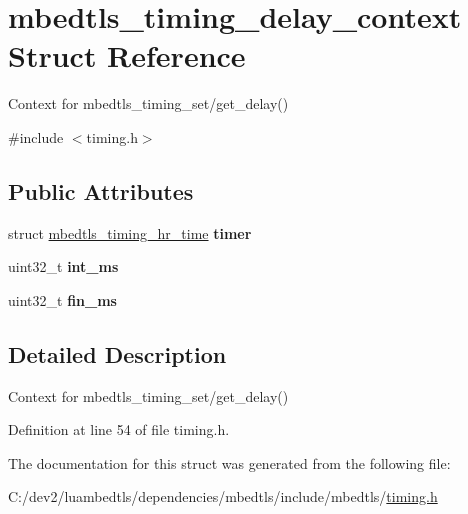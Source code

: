 \hypertarget{structmbedtls__timing__delay__context}{\section{mbedtls\-\_\-timing\-\_\-delay\-\_\-context Struct Reference}
\label{structmbedtls__timing__delay__context}
}


Context for mbedtls\-\_\-timing\-\_\-set/get\-\_\-delay()  




{\ttfamily \#include $<$timing.\-h$>$}

\subsection*{Public Attributes}
\begin{DoxyCompactItemize}
\item 
\hypertarget{structmbedtls__timing__delay__context_abf629e677a656c08a5aa3e5ba0cbf2d5}{struct \hyperlink{structmbedtls__timing__hr__time}{mbedtls\-\_\-timing\-\_\-hr\-\_\-time} {\bfseries timer}}\label{structmbedtls__timing__delay__context_abf629e677a656c08a5aa3e5ba0cbf2d5}

\item 
\hypertarget{structmbedtls__timing__delay__context_a9887c5bc1eb16059afbc163052ca1cb8}{uint32\-\_\-t {\bfseries int\-\_\-ms}}\label{structmbedtls__timing__delay__context_a9887c5bc1eb16059afbc163052ca1cb8}

\item 
\hypertarget{structmbedtls__timing__delay__context_af31d3fb6212e38581dbe3b97afc45f55}{uint32\-\_\-t {\bfseries fin\-\_\-ms}}\label{structmbedtls__timing__delay__context_af31d3fb6212e38581dbe3b97afc45f55}

\end{DoxyCompactItemize}


\subsection{Detailed Description}
Context for mbedtls\-\_\-timing\-\_\-set/get\-\_\-delay() 

Definition at line 54 of file timing.\-h.



The documentation for this struct was generated from the following file\-:\begin{DoxyCompactItemize}
\item 
C\-:/dev2/luambedtls/dependencies/mbedtls/include/mbedtls/\hyperlink{timing_8h}{timing.\-h}\end{DoxyCompactItemize}
